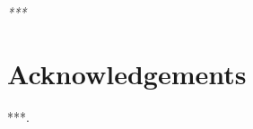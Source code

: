 \thispagestyle{empty}

\begin{flushright}
\emph{\scriptsize{
***}}
\end{flushright}

\clearpage
\thispagestyle{empty}
\null\newpage
\clearpage

\chapter*{Acknowledgements}
\thispagestyle{empty}
***.

\clearpage
\thispagestyle{empty}
\null\newpage
\clearpage
